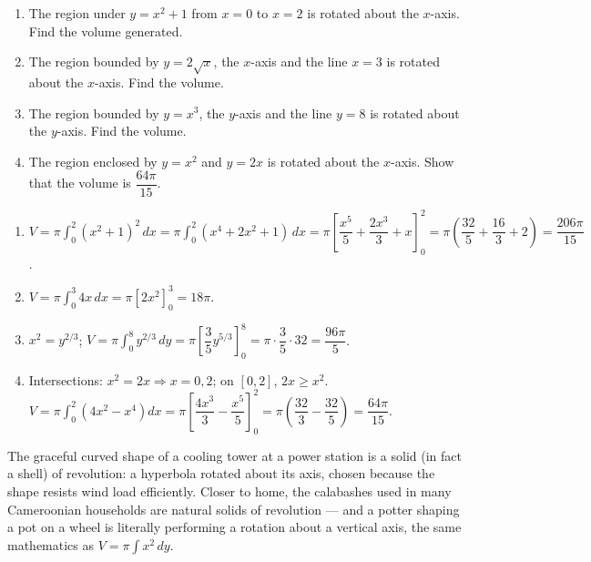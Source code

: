 \documentclass[11pt]{article}
\begin{document}
\begin{exercice}[Practice]
\begin{enumerate}
\item The region under $y=x^{2}+1$ from $x=0$ to $x=2$ is rotated about the $x$-axis. Find the volume generated.
\item The region bounded by $y=2\sqrt{x}$, the $x$-axis and the line $x=3$ is rotated about the $x$-axis. Find the volume.
\item The region bounded by $y=x^{3}$, the $y$-axis and the line $y=8$ is rotated about the $y$-axis. Find the volume.
\item The region enclosed by $y=x^{2}$ and $y=2x$ is rotated about the $x$-axis. Show that the volume is $\dfrac{64\pi}{15}$.
\end{enumerate}
\end{exercice}

\begin{corrige}[Exercise 1]
\begin{enumerate}
\item $V=\pi\displaystyle\int_{0}^{2}(x^{2}+1)^{2}\,dx=\pi\int_{0}^{2}(x^{4}+2x^{2}+1)\,dx=\pi\left[\dfrac{x^{5}}{5}+\dfrac{2x^{3}}{3}+x\right]_{0}^{2}=\pi\left(\dfrac{32}{5}+\dfrac{16}{3}+2\right)=\dfrac{206\pi}{15}$.
\item $V=\pi\displaystyle\int_{0}^{3}4x\,dx=\pi\left[2x^{2}\right]_{0}^{3}=18\pi$.
\item $x^{2}=y^{2/3}$; $V=\pi\displaystyle\int_{0}^{8}y^{2/3}\,dy=\pi\left[\dfrac{3}{5}y^{5/3}\right]_{0}^{8}=\pi\cdot\dfrac{3}{5}\cdot 32=\dfrac{96\pi}{5}$.
\item Intersections: $x^{2}=2x\Rightarrow x=0,2$; on $[0,2]$, $2x\ge x^{2}$. $V=\pi\displaystyle\int_{0}^{2}\left(4x^{2}-x^{4}\right)dx=\pi\left[\dfrac{4x^{3}}{3}-\dfrac{x^{5}}{5}\right]_{0}^{2}=\pi\left(\dfrac{32}{3}-\dfrac{32}{5}\right)=\dfrac{64\pi}{15}$.
\end{enumerate}
\end{corrige}

\begin{savaistu}
The graceful curved shape of a cooling tower at a power station is a solid (in fact a shell) of revolution: a hyperbola rotated about its axis, chosen because the shape resists wind load efficiently. Closer to home, the calabashes used in many Cameroonian households are natural solids of revolution — and a potter shaping a pot on a wheel is literally performing a rotation about a vertical axis, the same mathematics as $V=\pi\displaystyle\int x^{2}\,dy$.
\end{savaistu}
\end{document}
